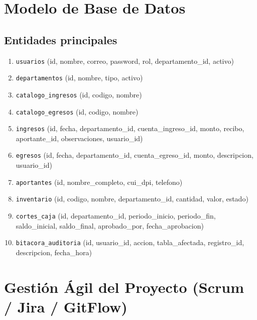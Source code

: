 \documentclass[11pt,a4paper]{article}
\begin{document}
	
	\newpage
	\section{Modelo de Base de Datos}
	
	\subsection{Entidades principales}
	\begin{enumerate}
		\item \texttt{usuarios} (id, nombre, correo, password, rol, departamento\_id, activo)
		\item \texttt{departamentos} (id, nombre, tipo, activo)
		\item \texttt{catalogo\_ingresos} (id, codigo, nombre)
		\item \texttt{catalogo\_egresos} (id, codigo, nombre)
		\item \texttt{ingresos} (id, fecha, departamento\_id, cuenta\_ingreso\_id, monto, recibo, aportante\_id, observaciones, usuario\_id)
		\item \texttt{egresos} (id, fecha, departamento\_id, cuenta\_egreso\_id, monto, descripcion, usuario\_id)
		\item \texttt{aportantes} (id, nombre\_completo, cui\_dpi, telefono)
		\item \texttt{inventario} (id, codigo, nombre, departamento\_id, cantidad, valor, estado)
		\item \texttt{cortes\_caja} (id, departamento\_id, periodo\_inicio, periodo\_fin, saldo\_inicial, saldo\_final, aprobado\_por, fecha\_aprobacion)
		\item \texttt{bitacora\_auditoria} (id, usuario\_id, accion, tabla\_afectada, registro\_id, descripcion, fecha\_hora)
	\end{enumerate}
	
	\section{Gestión Ágil del Proyecto (Scrum / Jira / GitFlow)}
	
\end{document}
